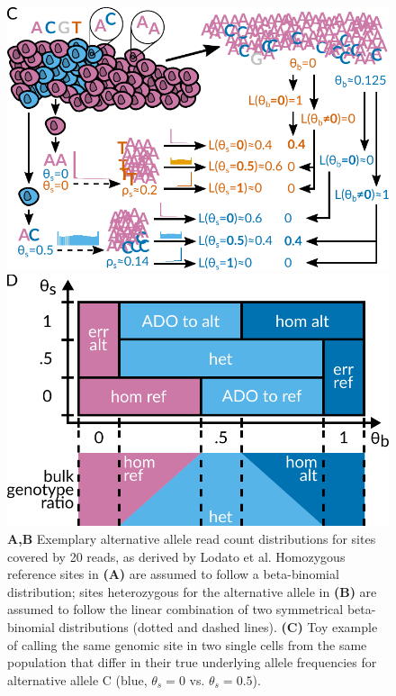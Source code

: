 \documentclass[fleqn,12pt,inline]{wlscirep}
\begin{document}
\begin{figure}[!tpb]
\begin{minipage}[t]{.99\linewidth}
\begin{minipage}{.47\linewidth}
      \includegraphics[width=.95\linewidth]{figs/prosolo_alt-calling_overview.pdf}
    \end{minipage}
    \hspace{2ex}
    \begin{minipage}{.49\linewidth}
      \includegraphics[width=.95\linewidth]{figs/Event_space.pdf}
    \end{minipage}
  \end{minipage}
  \caption{
   \textbf{A,B} Exemplary alternative allele read count distributions for sites covered by 20 reads, as derived by Lodato et al.\cite{lodato_somatic_2015}
   Homozygous reference sites in \textbf{(A)} are assumed to follow a beta-binomial distribution;
   sites heterozygous for the alternative allele in \textbf{(B)} are assumed to follow the linear combination of two symmetrical beta-binomial distributions (dotted and dashed lines).
   \textbf{(C)} Toy example of calling the same genomic site in two single cells from the same population that differ in their true underlying allele frequencies for alternative allele C (blue, $\theta_s = 0$ vs. $\theta_s = 0.5$).
}
\end{figure}
\end{document}
